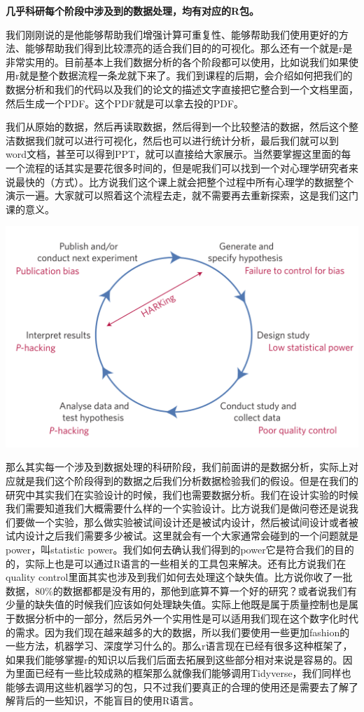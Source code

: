 \documentclass[
  oneside]{book}
\begin{document}
\textbf{几乎科研每个阶段中涉及到的数据处理，均有对应的R包。}

我们刚刚说的是他能够帮助我们增强计算可重复性、能够帮助我们使用更好的方法、能够帮助我们得到比较漂亮的适合我们目的的可视化。那么还有一个就是r是非常实用的。目前基本上我们数据分析的各个阶段都可以使用，比如说我们如果使用r就是整个数据流程一条龙就下来了。我们到课程的后期，会介绍如何把我们的数据分析和我们的代码以及我们的论文的描述文字直接把它整合到一个文档里面，然后生成一个PDF。这个PDF就是可以拿去投的PDF。

我们从原始的数据，然后再读取数据，然后得到一个比较整洁的数据，然后这个整洁数据我们就可以进行可视化，然后也可以进行统计分析，最后我们就可以到word文档，甚至可以得到PPT，就可以直接给大家展示。当然要掌握这里面的每一个流程的话其实是要花很多时间的，但是呢我们可以找到一个对心理学研究者来说最快的（方式）。比方说我们这个课上就会把整个过程中所有心理学的数据整个演示一遍。大家就可以照着这个流程去走，就不需要再去重新探索，这是我们这门课的意义。

\includegraphics{1001-lesson1/image-20230302200230583.png}

那么其实每一个涉及到数据处理的科研阶段，我们前面讲的是数据分析，实际上对应就是我们这个阶段得到的数据之后我们分析数据检验我们的假设。但是在我们的研究中其实我们在实验设计的时候，我们也需要数据分析。我们在设计实验的时候我们需要知道我们大概需要什么样的一个实验设计。比方说我们是做问卷还是说我们要做一个实验，那么做实验被试间设计还是被试内设计，然后被试间设计或者被试内设计之后我们需要多少被试。这里就会有一个大家通常会碰到的一个问题就是power，叫statistic power。我们如何去确认我们得到的power它是符合我们的目的的，实际上也是可以通过R语言的一些相关的工具包来解决。还有比方说我们在quality control里面其实也涉及到我们如何去处理这个缺失值。比方说你收了一批数据，80\%的数据都都是没有用的，那他到底算不算一个好的研究？或者说我们有少量的缺失值的时候我们应该如何处理缺失值。实际上他既是属于质量控制也是属于数据分析中的一部分，然后另外一个实用性是可以适用我们现在这个数字化时代的需求。因为我们现在越来越多的大的数据，所以我们要使用一些更加fashion的一些方法，机器学习、深度学习什么的。那么r语言现在已经有很多这种框架了，如果我们能够掌握r的知识以后我们后面去拓展到这些部分相对来说是容易的。因为里面已经有一些比较成熟的框架那么就像我们能够调用Tidyverse，我们同样也能够去调用这些机器学习的包，只不过我们要真正的合理的使用还是需要去了解了解背后的一些知识，不能盲目的使用R语言。
\end{document}
